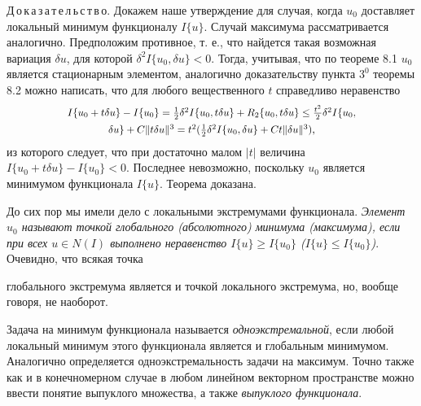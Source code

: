 	Д\,о\,к\,а\,з\,а\,т\,е\,л\,ь\,с\,т\,в\,о. Докажем наше утверждение для случая, когда $u_0$ доставляет локальный минимум функционалу $I\{u\}$. Случай максимума рассматривается аналогично. Предположим противное, т. е., что найдется такая возможная вариация $\delta u$, для которой $\delta^2 I\{u_0,\delta u\}<0$. Тогда, учитывая, что по теореме 8.1 $u_0$ является стационарным элементом, аналогично доказательству пункта $3^0$ теоремы 8.2 можно написать, что для любого вещественного $t$ справедливо неравенство
	\begin{gather}
		\scalebox{.9}{$I\{u_0+t\delta u\}-I\{u_0\}=\frac{1}{2} \delta^2 I\{u_0,t\delta u\}+R_2\{u_0,t\delta u\}\le \frac{t^2}{2} \delta^2 I\{u_0,$} \notag\\
		\scalebox{.9}{$\delta u\}+C\|t\delta u\|^3=t^2(\frac{1}{2} \delta^2 I\{u_0, \delta u\}+Ct \|\delta u\|^3)\text{,}$} \notag
	\end{gather}
	из которого следует, что при достаточно малом $|t|$ величина $I\{u_0+t\delta u\}-I\{u_0\}<0$. Последнее невозможно, поскольку $u_0$ является минимумом функционала $I\{u\}$. Теорема доказана.

	До сих пор мы имели дело с локальными экстремумами функционала. {\it Элемент $u_0$ называют точкой глобального (абсолютного) минимума (максимума), если при всех $u\in N(I)$ выполнено неравенство $I\{u\}\geq I\{u_0\}$ ($I\{u\}\le I\{u_0\}$)}. Очевидно, что всякая точка

	\newpage
	\noindent
	глобального экстремума является и точкой локального экстремума, но, вообще говоря, не наоборот.

	Задача на минимум функционала называется {\it одноэкстремальной}, если любой локальный минимум этого функционала является и глобальным минимумом. Аналогично определяется одноэкстремальность задачи на максимум. Точно также как и в конечномерном случае в любом линейном векторном пространстве можно ввести понятие выпуклого множества, а также {\it выпуклого функционала}.


